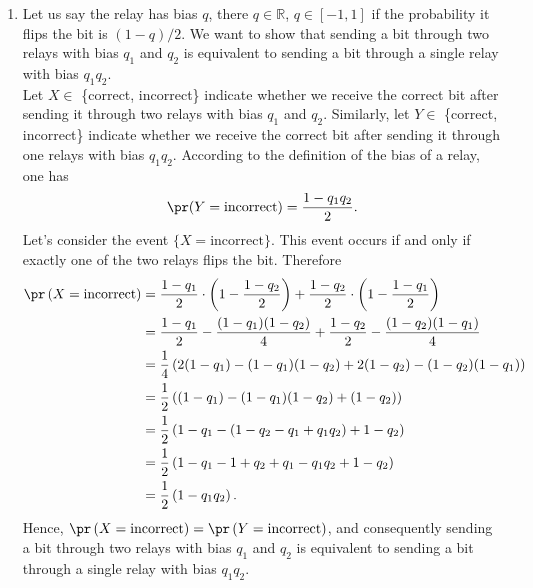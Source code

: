 \begin{enumerate}
   \item[(b)] Let us say the relay has bias $q$, there $q \in \mathbb{R}$,
   $q \in [-1, 1]$ if the probability it flips the bit is $(1 - q)/2$. We want
   to show that sending a bit through two relays with bias $q_1$ and $q_2$ is
   equivalent to sending a bit through a single relay with bias $q_1q_2$. \\
   Let $X \in $ \{correct, incorrect\} indicate whether we receive the correct bit
   after sending it through two relays with bias $q_1$ and $q_2$. Similarly, let
   $Y \in $ \{correct, incorrect\} indicate whether we receive the correct bit
   after sending it through one relays with bias $q_1q_2$. According to the
   definition of the bias of a relay, one has
   \[ \pr(Y = \text{incorrect}) = \frac{1 - q_1q_2}{2}. \]
   Let's consider the event $\{ X = \text{incorrect} \}$. This event occurs if and
   only if exactly one of the two relays flips the bit. Therefore
   \begin{align*}
     \pr\left( X = \text{incorrect} \right)
      &= \frac{1-q_1}{2} \cdot \left(1 - \frac{1-q_2}{2}\right) +
         \frac{1-q_2}{2} \cdot \left(1 - \frac{1-q_1}{2}\right) \\
      &= \frac{1-q_1}{2} - \frac{(1-q_1)(1-q_2)}{4} +
         \frac{1-q_2}{2} - \frac{(1-q_2)(1-q_1)}{4} \\
      &= \frac{1}{4} \left( 2(1-q_1) - (1-q_1)(1-q_2) + 2(1-q_2) - (1-q_2)(1-q_1) \right) \\
      &= \frac{1}{2} \left((1-q_1) - (1-q_1)(1-q_2) + (1-q_2) \right) \\
      &= \frac{1}{2} \left(1 - q_1 - (1 - q_2 - q_1 + q_1q_2) + 1 - q_2 \right) \\
      &= \frac{1}{2} \left(1 - q_1 - 1 + q_2 + q_1 - q_1q_2 + 1 - q_2 \right) \\
      &= \frac{1}{2} \left(1 - q_1q_2 \right). \\
   \end{align*}
   Hence, $\pr\left( X = \text{incorrect} \right) = \pr\left( Y = \text{incorrect}
   \right)$, and consequently sending a bit through two relays with bias $q_1$ and
   $q_2$ is equivalent to sending a bit through a single relay with bias $q_1q_2$.


\end{enumerate}
